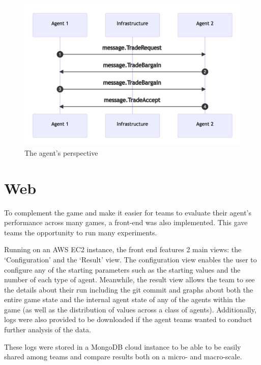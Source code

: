 \begin{figure}[htb]
    \centering
    \includegraphics{003_infrastructure/images/trade2.png}
    \caption{The agent's perspective}
    \label{fig:trade_agent}
\end{figure}

\section{Web}
To complement the game and make it easier for teams to evaluate their agent's performance across many games, a front-end was also implemented. This gave teams the opportunity to run many experiments.

Running on an AWS EC2 instance, the front end features 2 main views: the `Configuration' and the `Result' view. The configuration view enables the user to configure any of the starting parameters such as the starting values and the number of each type of agent. Meanwhile, the result view allows the team to see the details about their run including the git commit and graphs about both the entire game state and the internal agent state of any of the agents within the game (as well as the distribution of values across a class of agents). Additionally, logs were also provided to be downloaded if the agent teams wanted to conduct further analysis of the data.

These logs were stored in a MongoDB cloud instance to be able to be easily shared among teams and compare results both on a micro- and macro-scale.
